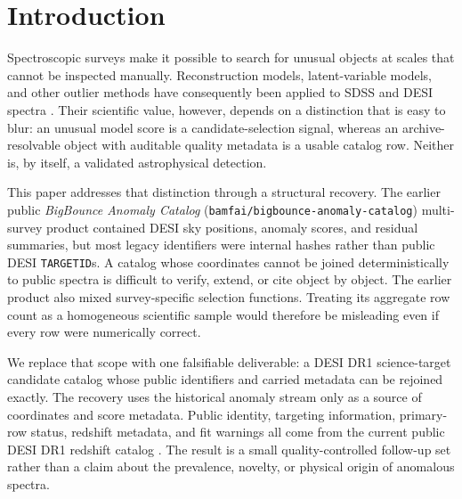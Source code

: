 \documentclass[twocolumn]{aastex701}
\begin{document}

\section{Introduction}\label{sec:introduction}

Spectroscopic surveys make it possible to search for unusual objects at scales that cannot be
inspected manually.  Reconstruction models, latent-variable models, and other outlier methods
have consequently been applied to SDSS and DESI spectra \citep{Baron2017,Liang2023,Nicolaou2026}.
Their scientific value, however, depends on a distinction that is easy to blur: an unusual model
score is a candidate-selection signal, whereas an archive-resolvable object with auditable
quality metadata is a usable catalog row.  Neither is, by itself, a validated astrophysical
detection.

This paper addresses that distinction through a structural recovery.  The earlier public
\textit{BigBounce Anomaly Catalog} (\nolinkurl{bamfai/bigbounce-anomaly-catalog}) multi-survey
product contained DESI sky positions, anomaly scores, and residual summaries, but most
legacy identifiers were internal hashes rather than public DESI \texttt{TARGETID}s.  A catalog
whose coordinates cannot be joined deterministically to public spectra is difficult to verify,
extend, or cite object by object.  The earlier product also mixed survey-specific selection
functions.  Treating its aggregate row count as a homogeneous scientific sample would therefore
be misleading even if every row were numerically correct.

We replace that scope with one falsifiable deliverable: a DESI DR1 science-target candidate
catalog whose public identifiers and carried metadata can be rejoined exactly.  The recovery
uses the historical anomaly stream only as a source of coordinates and score metadata.  Public
identity, targeting information, primary-row status, redshift metadata, and fit warnings all
come from the current public DESI DR1 redshift catalog \citep{DESI2025DR1}.  The result is a small
quality-controlled follow-up set rather than a claim about the prevalence, novelty, or physical
origin of anomalous spectra.
\end{document}
